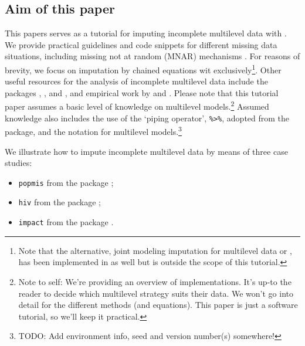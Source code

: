 \documentclass[
]{jss}
\providecommand{\tightlist}{%
  \setlength{\itemsep}{0pt}\setlength{\parskip}{0pt}}
\begin{document}
\hypertarget{aim-of-this-paper}{%
\subsection{Aim of this paper}\label{aim-of-this-paper}}

This papers serves as a tutorial for imputing incomplete multilevel data
with . We provide practical guidelines and code snippets for
different missing data situations, including missing not at random
(MNAR) mechanisms \citep[where the probability to be missing depends on
unrecorded information, making the missingness
non-ignorable,][]{rubi76, meng94}. For reasons of brevity, we focus on
imputation by chained equations wit  exclusively\footnote{Note
  that the alternative, joint modeling imputation for multilevel data or
   \citet{jomo}, has been implemented in  as well
  but is outside the scope of this tutorial.}. Other useful resources
for the analysis of incomplete multilevel data include the 
packages , , and , and empirical work
by \citet{audi18} and \citet{grun18}. Please note that this tutorial
paper assumes a basic level of knowledge on multilevel
models.\footnote{Note to self: We're providing an overview of
  implementations. It's up-to the reader to decide which multilevel
  strategy suits their data. We won't go into detail for the different
  methods (and equations). This paper is just a software tutorial, so
  we'll keep it practical.} Assumed knowledge also includes the use of
the `piping operator', \texttt{\%\textgreater{}\%}, adopted from the
 package, and the  notation for multilevel
models.\footnote{TODO: Add environment info, seed and version number(s)
  somewhere!}

We illustrate how to impute incomplete multilevel data by means of three
case studies:

\begin{itemize}
\tightlist
\item
  \texttt{popmis} from the  package \citep[simulated data on
  perceived popularity, \(n = 2,000\) pupils across \(N = 100\)
  schools,][]{mice};
\item
  \texttt{hiv} from the  package \citep[simulated data on HIV
  diagnoses, \(n = 6,416\) patients across \(N = 9\) regions,][]{GJRM};
\item
  \texttt{impact} from the  package \citep[empirical data
  on traumatic brain injuries, \(n = 11,022\) patients across \(N = 15\)
  studies,][]{metamisc}.
\end{itemize}
\end{document}
